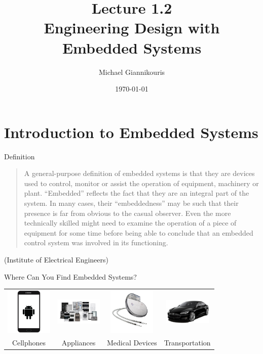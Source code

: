 \documentclass{beamer}
\title{Lecture 1.2 \\ Engineering Design with Embedded Systems}
\date{\today}
\author{Michael Giannikouris}
\institute{Department of Electrical and Computer Engineering}
\begin{document}
\maketitle

\section{Introduction to Embedded Systems}
	
	\begin{frame}{Definition}

		\begin{center}
			\begin{quote}
				A general-purpose definition of embedded systems is that they are
				devices used to control, monitor or assist the operation of equipment,
				machinery or plant. “Embedded” reflects the fact that they are an
				integral part of the system. In many cases, their “embeddedness” may
				be such that their presence is far from obvious to the casual observer.
				Even the more technically skilled might need to examine the operation
				of a piece of equipment for some time before being able to conclude
				that an embedded control system was involved in its functioning.
			\end{quote}
		\end{center}
		
		\begin{flushright}			
			(Institute of Electrical Engineers)
		\end{flushright}	
		
	\end{frame}  
	
	\begin{frame}{Where Can You Find Embedded Systems?}
		\begin{tabular}{c c c c}		
			\includegraphics[width=6em]{img/phone-icon-android-phone.png} &
			\includegraphics[width=6em]{img/appliances.png} &
			\includegraphics[width=6em]{img/Permanent-Pacemaker.png} &
			\includegraphics[width=6em]{img/must_diagonaal1.png} \\
			\tiny{Cellphones} &
			\tiny{Appliances} &
			\tiny{Medical Devices} &
			\tiny{Transportation}
		\end{tabular}
	\end{frame}
	
\end{document}
